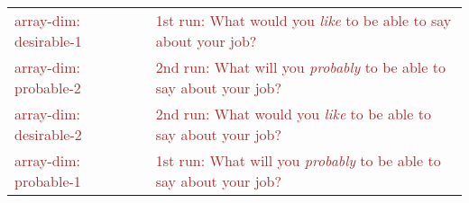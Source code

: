 \documentclass[a4paper,12pt]{article}\usepackage[]{graphicx}\usepackage[]{color}
\begin{document}
\begin{longtable}{H{72mm}m{0mm}m{75mm}}
  \textcolor{Brown}{array-dim: desirable-1} & \rule[-27mm]{0mm}{54mm} & \textcolor{brown}{1st run: What would you \emph{like} to be able to say about your job?} \\
  \textcolor{Brown}{array-dim: probable-2} & \rule[-27mm]{0mm}{54mm} & \textcolor{brown}{2nd run: What will you \emph{probably} to be able to say about your job?} \\

  \textcolor{Brown}{array-dim: desirable-2} & \rule[-27mm]{0mm}{54mm} & \textcolor{brown}{2nd run: What would you \emph{like} to be able to say about your job?} \\
  \textcolor{Brown}{array-dim: probable-1} & \rule[-27mm]{0mm}{54mm} & \textcolor{brown}{1st run: What will you \emph{probably} to be able to say about your job?} \\

\end{longtable}
\endgroup
\end{document}
